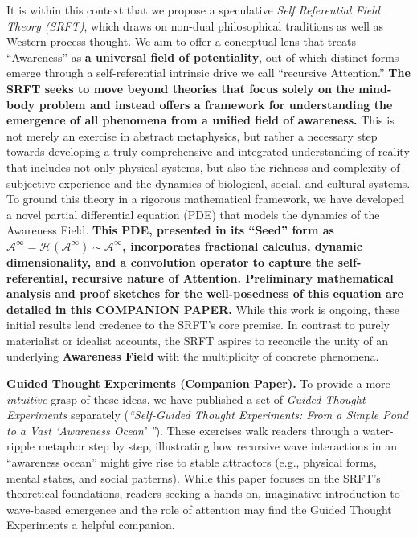\documentclass[12pt,a4paper]{article}
\begin{document}
It is within this context that we propose a speculative \emph{Self Referential Field Theory (SRFT)}, which draws on non-dual philosophical traditions as well as Western process thought. We aim to offer a conceptual lens that treats ``Awareness'' as \textbf{a universal field of potentiality}, out of which distinct forms emerge through a self-referential intrinsic drive we call ``recursive Attention.'' \textbf{The SRFT seeks to move beyond theories that focus solely on the mind-body problem and instead offers a framework for understanding the emergence of all phenomena from a unified field of awareness.} This is not merely an exercise in abstract metaphysics, but rather a necessary step towards developing a truly comprehensive and integrated understanding of reality that includes not only physical systems, but also the richness and complexity of subjective experience and the dynamics of biological, social, and cultural systems.  To ground this theory in a rigorous mathematical framework, we have developed a novel partial differential equation (PDE) that models the dynamics of the Awareness Field. \textbf{This PDE, presented in its ``Seed'' form as \(\mathscr{A}^\infty = \mathcal{H}(\mathscr{A}^\infty) \sim \mathscr{A}^\infty\), incorporates fractional calculus, dynamic dimensionality, and a convolution operator to capture the self-referential, recursive nature of Attention.  Preliminary mathematical analysis and proof sketches for the well-posedness of this equation are detailed in this COMPANION PAPER.} While this work is ongoing, these initial results lend credence to the SRFT's core premise. In contrast to purely materialist or idealist accounts, the SRFT aspires to reconcile the unity of an underlying \textbf{Awareness Field} with the multiplicity of concrete phenomena.

\vspace{1em}
\noindent\textbf{Guided Thought Experiments (Companion Paper).}
To provide a more \emph{intuitive} grasp of these ideas, we have published a set of \emph{Guided Thought Experiments} separately 
(\emph{``Self-Guided Thought Experiments: From a Simple Pond to a Vast `Awareness Ocean' ''}). These exercises walk readers through a water-ripple metaphor step by step, illustrating how recursive wave interactions in an “awareness ocean” might give rise to stable attractors (e.g., physical forms, mental states, and social patterns). While this paper focuses on the 
SRFT’s theoretical foundations, readers seeking a hands-on, imaginative introduction to wave-based emergence and the role of attention may find the Guided Thought Experiments a helpful companion.
\end{document}
